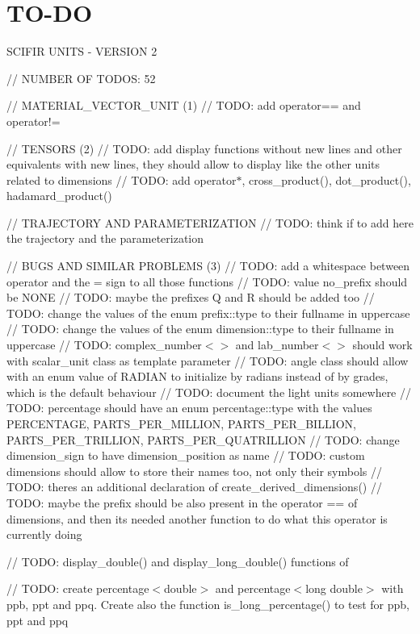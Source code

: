 \chapter{TO-\/\+DO}
\hypertarget{md_TO-DO}{}\label{md_TO-DO}
SCIFIR UNITS -\/ VERSION 2

// NUMBER OF TODOS\+: 52

// MATERIAL\+\_\+\+VECTOR\+\_\+\+UNIT (1) // TODO\+: add operator== and operator!=

// TENSORS (2) // TODO\+: add display functions without new lines and other equivalents with new lines, they should allow to display like the other units related to dimensions // TODO\+: add operator\texorpdfstring{$\ast$}{*}, cross\+\_\+product(), dot\+\_\+product(), hadamard\+\_\+product()

// TRAJECTORY AND PARAMETERIZATION // TODO\+: think if to add here the trajectory and the parameterization

// BUGS AND SIMILAR PROBLEMS (3) // TODO\+: add a whitespace between operator and the = sign to all those functions // TODO\+: value no\+\_\+prefix should be NONE // TODO\+: maybe the prefixes Q and R should be added too // TODO\+: change the values of the enum prefix\+::type to their fullname in uppercase // TODO\+: change the values of the enum dimension\+::type to their fullname in uppercase // TODO\+: complex\+\_\+number$<$$>$ and lab\+\_\+number$<$$>$ should work with scalar\+\_\+unit class as template parameter // TODO\+: angle class should allow with an enum value of RADIAN to initialize by radians instead of by grades, which is the default behaviour // TODO\+: document the light units somewhere // TODO\+: percentage should have an enum percentage\+::type with the values PERCENTAGE, PARTS\+\_\+\+PER\+\_\+\+MILLION, PARTS\+\_\+\+PER\+\_\+\+BILLION, PARTS\+\_\+\+PER\+\_\+\+TRILLION, PARTS\+\_\+\+PER\+\_\+\+QUATRILLION // TODO\+: change dimension\+\_\+sign to have dimension\+\_\+position as name // TODO\+: custom dimensions should allow to store their names too, not only their symbols // TODO\+: there\textquotesingle{}s an additional declaration of create\+\_\+derived\+\_\+dimensions() // TODO\+: maybe the prefix should be also present in the operator == of dimensions, and then it\textquotesingle{}s needed another function to do what this operator is currently doing

// TODO\+: display\+\_\+double() and display\+\_\+long\+\_\+double() functions of 

// TODO\+: create percentage$<$double$>$ and percentage$<$long double$>$ with ppb, ppt and ppq. Create also the function is\+\_\+long\+\_\+percentage() to test for ppb, ppt and ppq

